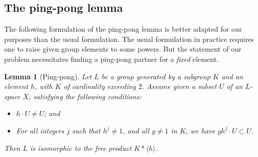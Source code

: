 \documentclass{amsart}
\theoremstyle{plain}
\newtheorem{lemma}[theorem]{Lemma}
\theoremstyle{definition}
\theoremstyle{remark}
\begin{document}
\subsection{The ping-pong lemma}\label{sec:pingpong}
The following formulation of the ping-pong lemma is better adapted for our purposes than
the usual formulation. The usual formulation in practice requires one to raise given group
elements to some powers. But the statement of our problem necessitates finding a
ping-pong partner for a \emph{fixed} element.

\begin{lemma}[Ping-pong]\label{lem:pingpong}
Let $L$ be a group generated by a subgroup $K$ and an element $h$,
with $K$ of cardinality exceeding $2$. Assume given a subset $U$ of an $L$-space $X$,
satisfying the following conditions:
\begin{itemize}
\item[(i)] $h\cdot U \neq U$; and
\item[(ii)] For all integers $j$ such that  $h^{j} \neq 1$, and all $g \neq 1$ in $K$, we
have $gh^{j}\cdot U \subset U$.
\end{itemize}
Then $L$ is isomorphic to the free product $K * \langle h\rangle$.
\end{lemma}
\end{document}
